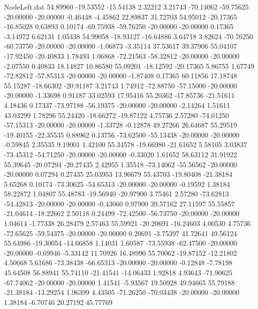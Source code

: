 \begin{filecontents}{NodeLeft.dat}
  54.89960  -19.53552  -15.54138     2.32212    3.21743  -70.14062  -59.75625  -20.00000  -20.00000   -0.46448   -4.45862   22.89837   31.72703
  54.95012  -20.17365  -16.85028     0.63893    0.10174  -69.75938  -59.76250  -20.00000  -20.00000    0.17365   -3.14972    6.62131    1.05438
  54.99058  -18.93127  -16.64886     3.64718    3.82624  -70.76250  -60.73750  -20.00000  -20.00000   -1.06873   -3.35114   37.53617   39.37906
  55.04107  -17.92450  -20.40833     1.78493    1.06868  -72.21563  -58.32812  -20.00000  -20.00000   -2.07550    0.40833   18.14827   10.86580
  55.09201  -18.12592  -20.17365     5.86755    1.67749  -72.82812  -57.85313  -20.00000  -20.00000   -1.87408    0.17365   60.11856   17.18748
  55.15287  -18.66302  -20.91187     3.21743    1.74912  -72.88750  -57.15000  -20.00000  -20.00000   -1.33698    0.91187   33.02593   17.95416
  55.20362  -17.85736  -21.51611     4.18436    0.17337  -73.97188  -56.19375  -20.00000  -20.00000   -2.14264    1.51611   43.03299    1.78296
  55.24420  -18.66272  -19.87122     4.75736    2.57280  -74.01250  -57.15313  -20.00000  -20.00000   -1.33728   -0.12878   49.27266   26.64687
  55.29519  -19.40155  -22.35535     0.88962    0.13756  -73.62500  -55.13438  -20.00000  -20.00000   -0.59845    2.35535    9.19001    1.42100
  55.34578  -19.66980  -21.61652     5.58105    3.03837  -73.45312  -54.71250  -20.00000  -20.00000   -0.33020    1.61652   58.63112   31.91922
  55.39645  -20.07294  -20.27435     2.42955    1.35518  -73.14062  -55.56562  -20.00000  -20.00000    0.07294    0.27435   25.03953   13.96679
  55.43703  -19.80408  -21.38184     5.65268    0.10174  -73.30625  -54.65313  -20.00000  -20.00000   -0.19592    1.38184   58.22872    1.04807
  55.48783  -19.56940  -20.97900     3.75461    2.57280  -73.62813  -54.42813  -20.00000  -20.00000   -0.43060    0.97900   39.57162   27.11597
  55.55857  -21.04614  -18.22662     2.50118    0.24499  -72.42500  -56.73750  -20.00000  -20.00000    1.04614   -1.77338   26.28479    2.57463
  55.59921  -20.20691  -16.24603     4.00530    4.75736  -72.65625  -59.54375  -20.00000  -20.00000    0.20691   -3.75397   41.72641   49.56124
  55.64986  -19.30054  -14.66858     1.14031    1.60587  -73.55938  -62.47500  -20.00000  -20.00000   -0.69946   -5.33142   11.70926   16.48990
  55.70062  -19.87152  -12.21802     4.50668    5.61686  -73.38438  -66.65313  -20.00000  -20.00000   -0.12848   -7.78198   45.64508   56.88941
  55.74110  -21.41541  -14.06433     1.92818    4.93643  -71.90625  -67.74062  -20.00000  -20.00000    1.41541   -5.93567   19.50928   49.94665
  55.79188  -21.38184  -13.29254     1.96399    4.43505  -71.26250  -70.03438  -20.00000  -20.00000    1.38184   -6.70746   20.27192   45.77769

\end{filecontents}
